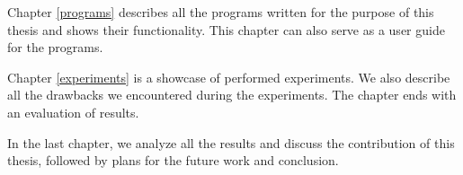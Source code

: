 Chapter \ref{programs} describes all the programs written for the purpose of this thesis and shows their functionality. This chapter can also serve as a user guide for the programs.

Chapter \ref{experiments} is a showcase of performed experiments. We also describe all the drawbacks we encountered during the experiments. The chapter ends with an evaluation of results.

In the last chapter, we analyze all the results and discuss the contribution of this thesis, followed by plans for the future work and conclusion.
